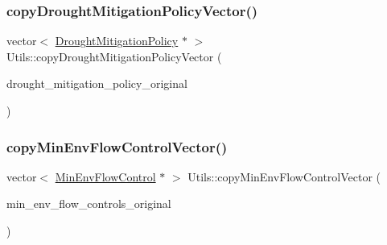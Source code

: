\mbox{\label{classUtils_ac387c706746bffa0308e1fad7a6cd7a6_ac387c706746bffa0308e1fad7a6cd7a6}} 
\subsubsection{\texorpdfstring{copy\+Drought\+Mitigation\+Policy\+Vector()}{copyDroughtMitigationPolicyVector()}}
{\footnotesize\ttfamily vector$<$ \mbox{\hyperlink{classDroughtMitigationPolicy}{Drought\+Mitigation\+Policy}} $\ast$ $>$ Utils\+::copy\+Drought\+Mitigation\+Policy\+Vector (\begin{DoxyParamCaption}\item[{vector$<$ \mbox{\hyperlink{classDroughtMitigationPolicy}{Drought\+Mitigation\+Policy}} $\ast$$>$}]{drought\+\_\+mitigation\+\_\+policy\+\_\+original }\end{DoxyParamCaption})\hspace{0.3cm}{\ttfamily [static]}}

\mbox{\label{classUtils_af0041ddac14b680b4039e378b060b6f7_af0041ddac14b680b4039e378b060b6f7}} 
\subsubsection{\texorpdfstring{copy\+Min\+Env\+Flow\+Control\+Vector()}{copyMinEnvFlowControlVector()}}
{\footnotesize\ttfamily vector$<$ \mbox{\hyperlink{classMinEnvFlowControl}{Min\+Env\+Flow\+Control}} $\ast$ $>$ Utils\+::copy\+Min\+Env\+Flow\+Control\+Vector (\begin{DoxyParamCaption}\item[{vector$<$ \mbox{\hyperlink{classMinEnvFlowControl}{Min\+Env\+Flow\+Control}} $\ast$$>$}]{min\+\_\+env\+\_\+flow\+\_\+controls\+\_\+original }\end{DoxyParamCaption})\hspace{0.3cm}{\ttfamily [static]}}

\mbox{\label{classUtils_aae13775d0c17ca43ae39450188958d7d_aae13775d0c17ca43ae39450188958d7d}} 
